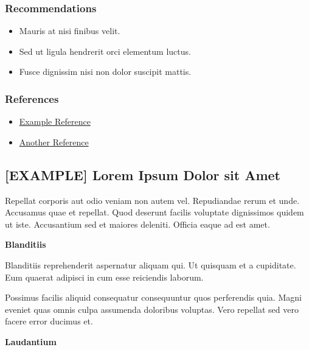 \documentclass[a4paper]{article}
\def\tightlist{}
\begin{document}
          \subsubsection{Recommendations}

      \begin{itemize}
\tightlist
\item
  Mauris at nisi finibus velit.
\item
  Sed ut ligula hendrerit orci elementum luctus.
\item
  Fusce dignissim nisi non dolor suscipit mattis.
\end{itemize}

    
          \subsubsection{References}

      \begin{itemize}
\tightlist
\item
  \href{https://example.com/}{Example Reference}
\item
  \href{https://example.com/}{Another Reference}
\end{itemize}

    
    
    \clearpage

    

      \newpage
    
    \subsection{[EXAMPLE] Lorem Ipsum Dolor sit Amet}
    \label{1:EXAMPLE:issue.md}

    Repellat corporis aut odio veniam non autem vel.
Repudiandae rerum et unde. Accusamus quae et repellat.
Quod deserunt facilis voluptate dignissimos quidem ut iste.
Accusantium sed et maiores deleniti.
Officia eaque ad est amet.

\textbf{Blanditiis}

Blanditiis reprehenderit aspernatur aliquam qui.
Ut quisquam et a cupiditate.
Eum quaerat adipisci in cum esse reiciendis laborum.

Possimus facilis aliquid consequatur consequuntur quos perferendis quia.
Magni eveniet quas omnis culpa assumenda doloribus voluptas.
Vero repellat sed vero facere error ducimus et.

\textbf{Laudantium}
\end{document}
